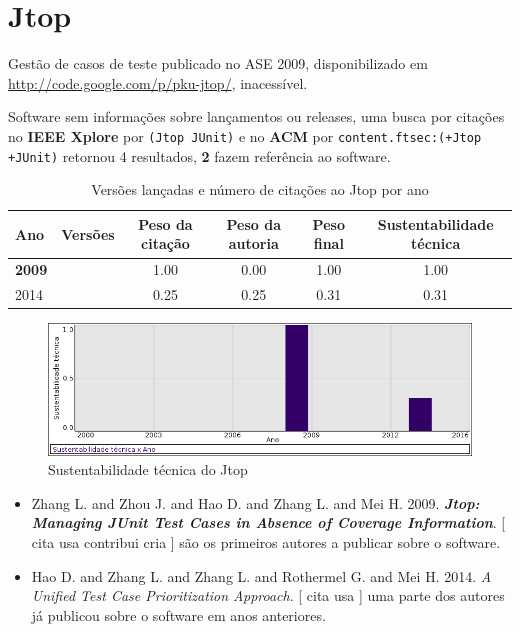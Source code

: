 \section{Jtop}

Gestão de casos de teste
publicado no ASE 2009,
disponibilizado em \url{http://code.google.com/p/pku-jtop/},
inacessível.

Software sem informações sobre lançamentos ou releases,
uma busca por citações no {\bf IEEE Xplore} por
\texttt{(Jtop JUnit)}
e no {\bf ACM} por
\texttt{content.ftsec:(+Jtop +JUnit)}
retornou
4 resultados,
{\bf 2} fazem referência ao software.


\begin{table}[H]
\caption{Versões lançadas e número de citações ao Jtop por ano}
\centering
\begin{tabular}{| l | c | c | c | c | c |}
  \hline
  Ano & Versões & Peso da citação & Peso da autoria & Peso final & Sustentabilidade técnica \\
  \hline
            {\bf 2009}
          &
          
          &
          1.00
          &
          0.00
          &
          1.00
          &
            {\color{blue} 1.00}
          \\
\hline
            2014
          &
          
          &
          0.25
          &
          0.25
          &
          0.31
          &
            {\color{red} 0.31}
          \\
\hline
\end{tabular}
\end{table}

\begin{figure}[h]
  \center
  \includegraphics[scale=0.50]{result-documents/charts/jtop.png}
  \caption{Sustentabilidade técnica do Jtop}
\end{figure}


\begin{itemize}
\item Zhang L. and Zhou J. and Hao D. and Zhang L. and Mei H.
      2009.
        \textbf{\textit{ Jtop: Managing JUnit Test Cases in Absence of Coverage Information}}.
      [
          cita
          usa
          contribui
          cria
      ]
são os primeiros autores a publicar sobre o software.
\item Hao D. and Zhang L. and Zhang L. and Rothermel G. and Mei H.
      2014.
        \textit{ A Unified Test Case Prioritization Approach}.
      [
          cita
          usa
      ]
uma parte dos autores já publicou sobre o software em anos anteriores.
\end{itemize}
